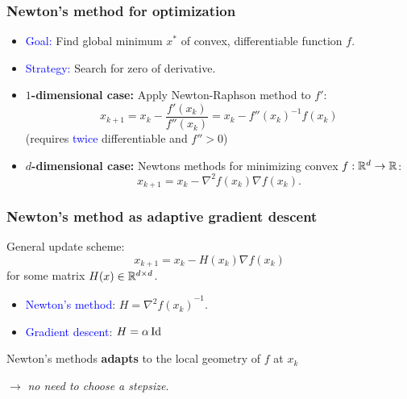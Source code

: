 \documentclass[aspectratio=149]{beamer}
\begin{document}
\begin{frame}
  \frametitle{Newton's method for optimization}
  \begin{itemize}
    \item \textcolor{blue}{Goal:} Find global minimum $x^*$ of convex, differentiable function $f$.
    \item \textcolor{blue}{Strategy:} Search for zero of derivative.
    \item \textbf{$1$-dimensional case:} Apply Newton-Raphson method to $f'$:
          \begin{equation}
            x_{k+1} = x_k - \frac{f'(x_k)}{f''(x_k)} = x_k - {f''(x_k)}^{-1} f(x_k)
          \end{equation}
          (requires \textcolor{blue}{twice} differentiable and $f'' > 0$)

    \item \textbf{$d$-dimensional case:} Newtons methods for minimizing convex $f: \mathbb{R}^d \to \mathbb{R}$:
          \begin{equation}
            x_{k+1} = x_k - \nabla^2 f(x_k) \nabla f(x_k).
          \end{equation}
  \end{itemize}
\end{frame}


\begin{frame}
  \frametitle{Newton's method as adaptive gradient descent}
  General update scheme:
  \begin{equation}
    x_{k+1} = x_k - H(x_k) \nabla f(x_k)
  \end{equation}
  for some matrix $H(x) \in \mathbb{R}^{d \times d}$.
  \begin{itemize}
    \item \textcolor{blue}{Newton's method}: $H = {\nabla^2 f(x_k)}^{-1}$.
    \item \textcolor{blue}{Gradient descent}: $H = \alpha \operatorname*{Id}$
  \end{itemize}
  \vspace{1cm}
 \begin{block}{}
  Newton's methods \textbf{adapts} to the local geometry of $f$ at $x_k$ \\
 \end{block}
  $\rightarrow$ \textit{no need to choose a stepsize}.
\end{frame}
\end{document}
